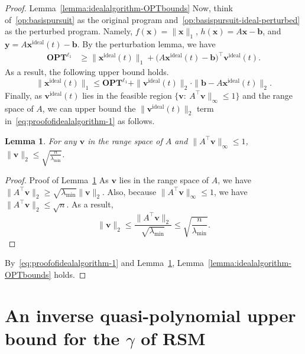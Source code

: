 \documentclass[11pt]{article}
\newtheorem{lemma}{Lemma}[section]
\theoremstyle{remark}
\theoremstyle{definition}
\newcommand{\by}{\mathbf{y}}
\newcommand{\bx}{\mathbf{x}}
\newcommand{\bb}{\mathbf{b}}
\newcommand{\bv}{\mathbf{v}}
\newcommand{\OPT}{\mathbf{OPT}}
\begin{document}
\begin{proof}{Lemma~\ref{lemma:idealalgorithm-OPTbounds}}
	Now, think of~\eqref{op:basispursuit} as the original program and~\eqref{op:basispursuit-ideal-perturbed} as the perturbed program. Namely, $f(\bx)=\|\bx\|_1$, $h(\bx)=A\bx-\bb$, and $\by=A\bx^{\text{ideal}}(t)-\bb$. By the perturbation lemma, we have
	\begin{align*}
	\OPT^{\ell_1}&\geq \|\bx^{\text{ideal}}(t)\|_1 +  \Big(A\bx^{\text{ideal}}(t)-\bb\Big)^\top\bv^{\text{ideal}}(t).
	\end{align*}
	As a result, the following upper bound holds.
	\begin{equation}\label{eq:proofofidealalgorithm-1}
	\|\bx^{\text{ideal}}(t)\|_1\leq\OPT^{\ell_1} + \|\bv^{\text{ideal}}(t)\|_2\cdot\|\bb-A\bx^{\text{ideal}}(t)\|_2.
	\end{equation}
	Finally, as $\bv^{\text{ideal}}(t)$ lies in the feasible region $\{\bv:\ A^\top \bv\|_{\infty}\leq1 \}$ and the range space of $A$, we can upper bound the $\|\bv^{\text{ideal}}(t)\|_2$ term in~\eqref{eq:proofofidealalgorithm-1} as follows.
	\begin{lemma}\label{lemma:proofofidealalgorithm-vbound}
		For any $\bv$ in the range space of $A$ and $\|A^\top \bv\|_{\infty}\leq1$, $\|\bv\|_2\leq\sqrt{\frac{n}{\lambda_{\min}}}$.
	\end{lemma}
	\begin{proof}{Proof of Lemma~\ref{lemma:proofofidealalgorithm-vbound}}
		As $\bv$ lies in the range space of $A$, we have $\|A^\top\bv\|_2\geq\sqrt{\lambda_{\min}}\|\bv\|_2$. Also, because $\|A^\top\bv\|_{\infty}\leq1$, we have $\|A^\top\bv\|_2\leq\sqrt{n}$. As a result, 
		\begin{equation*}
		\|\bv\|_2\leq\frac{\|A^\top\bv\|_2}{\sqrt{\lambda_{\min}}}\leq\sqrt{\frac{n}{\lambda_{\min}}}.
		\end{equation*}
	\end{proof}
	By~\eqref{eq:proofofidealalgorithm-1} and Lemma~\ref{lemma:proofofidealalgorithm-vbound}, Lemma~\ref{lemma:idealalgorithm-OPTbounds} holds.		
\end{proof}



\section{An inverse quasi-polynomial upper bound for the $\gamma$ of RSM}\label{sec:quasi poly ub for gamma of RSM}
\end{document}
